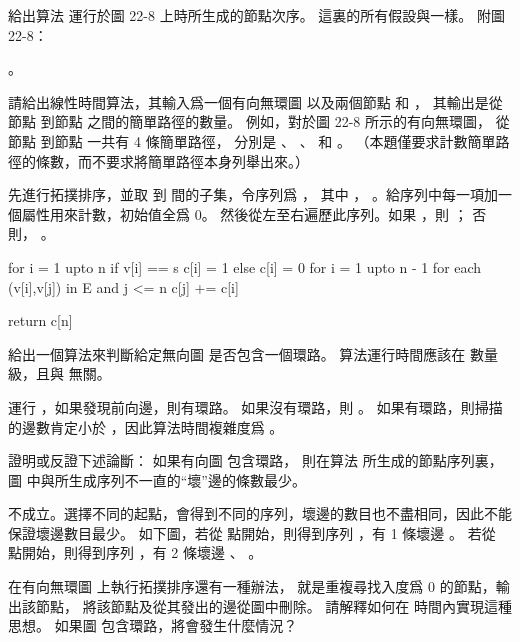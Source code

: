 \startsection[
  title={Topological sort},
]

\startEXERCISE
給出算法  運行於圖 22-8 上時所生成的節點次序。
這裏的所有假設與\inexercise[22.3-2] 一樣。
附圖 22-8：

\externalfigure[output/e22_4_1-1]
\stopEXERCISE

\startANSWER
{}。
\stopANSWER

\startEXERCISE
請給出線性時間算法，其輸入爲一個有向無環圖  以及兩個節點  和 ，
其輸出是從節點  到節點  之間的簡單路徑的數量。
例如，對於圖 22-8 所示的有向無環圖，
從節點  到節點  一共有 4 條簡單路徑，
分別是 、 、  和 。
（本題僅要求計數簡單路徑的條數，而不要求將簡單路徑本身列舉出來。）
\stopEXERCISE

\startANSWER
先進行拓撲排序，並取  到  間的子集，令序列爲 ，
其中 ， 。給序列中每一項加一個屬性用來計數，初始值全爲 0。
然後從左至右遍歷此序列。如果 ，則 ；
否則， 。

\startCLRS
for i = 1 upto n
	if v[i] == s
		c[i] = 1
	else
		c[i] = 0
for i = 1 upto n - 1
	for each (v[i],v[j]) in E and j <= n
		c[j] += c[i]

return c[n]
\stopCLRS
\stopANSWER

\startEXERCISE
給出一個算法來判斷給定無向圖  是否包含一個環路。
算法運行時間應該在  數量級，且與  無關。
\stopEXERCISE

\startANSWER
運行 ，如果發現前向邊，則有環路。
如果沒有環路，則 。
如果有環路，則掃描的邊數肯定小於 ，因此算法時間複雜度爲 。
\stopANSWER

\startEXERCISE
證明或反證下述論斷：
如果有向圖  包含環路，
則在算法  所生成的節點序列裏，
圖  中與所生成序列不一直的“壞”邊的條數最少。
\stopEXERCISE

\startANSWER
不成立。選擇不同的起點，會得到不同的序列，壞邊的數目也不盡相同，因此不能保證壞邊數目最少。
如下圖，若從  點開始，則得到序列 ，有 1 條壞邊 。
若從  點開始，則得到序列 ，有 2 條壞邊 、 。

\externalfigure[output/e22_4_4-1]
\stopANSWER

\startEXERCISE
在有向無環圖  上執行拓撲排序還有一種辦法，
就是重複尋找入度爲 0 的節點，輸出該節點，
將該節點及從其發出的邊從圖中刪除。
請解釋如何在  時間內實現這種思想。
如果圖  包含環路，將會發生什麼情況？
\stopEXERCISE

